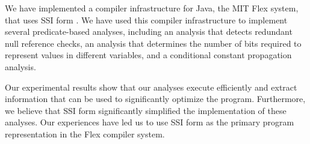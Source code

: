 We have implemented a compiler infrastructure for Java,
the MIT Flex system, that uses SSI form \cite{flexweb}.
We have used 
this compiler infrastructure to implement several 
predicate-based analyses, including an analysis that
detects redundant null reference checks, an
analysis that determines the number of bits
required to represent values in different variables,
and a conditional constant propagation analysis.

Our experimental results show that our analyses
execute efficiently and extract information that can
be used to significantly optimize the program.
Furthermore, we believe that SSI form significantly
simplified the implementation of these analyses.
Our experiences have led us to use SSI form 
as the primary program representation in the Flex
compiler system.
